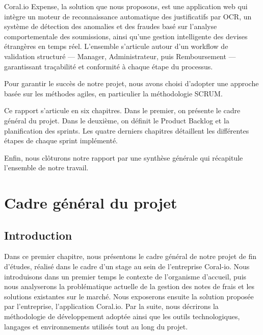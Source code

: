 \documentclass[12pt,a4paper]{report}
\let\oldchapter\chapter
\def\chapter{\clearpage\setcounter{section}{0}\oldchapter}
\begin{document}
Coral.io Expense, la solution que nous proposons, est une application web qui intègre un moteur de reconnaissance automatique des justificatifs par OCR, un système de détection des anomalies et des fraudes basé sur l'analyse comportementale des soumissions, ainsi qu'une gestion intelligente des devises étrangères en temps réel. L'ensemble s'articule autour d'un workflow de validation structuré — Manager, Administrateur, puis Remboursement — garantissant traçabilité et conformité à chaque étape du processus.



Pour garantir le succès de notre projet, nous avons choisi d'adopter une approche basée sur les méthodes agiles, en particulier la méthodologie SCRUM.



Ce rapport s'articule en six chapitres. Dans le premier, on présente le cadre général du projet. Dans le deuxième, on définit le Product Backlog et la planification des sprints. Les quatre derniers chapitres détaillent les différentes étapes de chaque sprint implémenté.



Enfin, nous clôturons notre rapport par une synthèse générale qui récapitule l'ensemble de notre travail.






\chapter{Cadre général du projet}



\section*{Introduction}


Dans ce premier chapitre, nous présentons le cadre général de notre projet de fin d'études, réalisé dans le cadre d'un stage au sein de l'entreprise Coral-io. Nous introduisons dans un premier temps le contexte de l'organisme d'accueil, puis nous analyserons la problématique actuelle de la gestion des notes de frais et les solutions existantes sur le marché. Nous exposerons ensuite la solution proposée par l'entreprise, l'application Coral.io. Par la suite, nous décrirons la méthodologie de développement adoptée ainsi que les outils technologiques, langages et environnements utilisés tout au long du projet.
\end{document}
